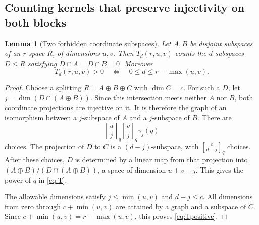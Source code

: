 \documentclass[11pt]{article}
\numberwithin{equation}{section}
\newtheorem{lemma}[theorem]{Lemma}
\theoremstyle{definition}
\theoremstyle{remark}
\newcommand{\qbin}[2]{\genfrac{[}{]}{0pt}{}{#1}{#2}_{q}}
\begin{document}
\subsection{Counting kernels that preserve injectivity on both blocks}
\begin{lemma}[Two forbidden coordinate subspaces]\label{lem:kernels}
Let $A,B$ be disjoint subspaces of an $r$-space $R$, of dimensions $u,v$. Then $T_d(r,u,v)$ counts the $d$-subspaces $D\le R$ satisfying $D\cap A=D\cap B=0$. Moreover
\begin{equation}\label{eq:Tpositive}
 T_d(r,u,v)>0\quad\Longleftrightarrow\quad
 0\le d\le r-\max(u,v).
\end{equation}
\end{lemma}
\begin{proof}
Choose a splitting $R=A\oplus B\oplus C$ with $\dim C=c$. For such a $D$, let
$j=\dim(D\cap(A\oplus B))$. Since this intersection meets neither $A$ nor $B$, both coordinate projections are injective on it. It is therefore the graph of an isomorphism between a $j$-subspace of $A$ and a $j$-subspace of $B$. There are
\[
 \qbin uj\qbin vj\gamma_j(q)
\]
choices. The projection of $D$ to $C$ is a $(d-j)$-subspace, with $\qbin c{d-j}$ choices. After these choices, $D$ is determined by a linear map from that projection into
$(A\oplus B)/(D\cap(A\oplus B))$, a space of dimension $u+v-j$. This gives the power of $q$ in \eqref{eq:T}.

The allowable dimensions satisfy $j\le\min(u,v)$ and $d-j\le c$. All dimensions from zero through $c+\min(u,v)$ are attained by a graph and a subspace of $C$. Since $c+\min(u,v)=r-\max(u,v)$, this proves \eqref{eq:Tpositive}.
\end{proof}
\end{document}

